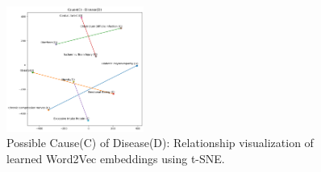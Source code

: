 \begin{figure}
    \includegraphics[width=0.40\textwidth]{figures/cause_disease.png}
    \caption{Possible Cause(C) of Disease(D): Relationship visualization of learned Word2Vec embeddings using t-SNE.}
    \label{fig:cause-disease}
\end{figure}


